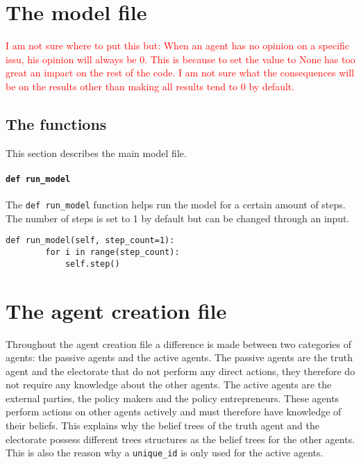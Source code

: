 

%
\section{The model file}

\textcolor{red}{I am not sure where to put this but: When an agent has no opinion on a specific issu, his opinion will always be 0. This is because to set the value to None has too great an impact on the rest of the code. I am not sure what the consequences will be on the results other than making all results tend to 0 by default.}

\subsection{The functions}

This section describes the main model file.

\paragraph{\texttt{def run\_model}}

The \texttt{def run\_model} function helps run the model for a certain amount of steps. The number of steps is set to 1 by default but can be changed through an input.

\begin{lstlisting}
def run_model(self, step_count=1):
		for i in range(step_count):
			self.step()
\end{lstlisting}


%
\section{The agent creation file}

Throughout the agent creation file a difference is made between two categories of agents: the passive agents and the active agents. The passive agents are the truth agent and the electorate that do not perform any direct actions, they therefore do not require any knowledge about the other agents. The active agents are the external parties, the policy makers and the policy entrepreneurs. These agents perform actions on other agents actively and must therefore have knowledge of their beliefs. This explains why the belief trees of the truth agent and the electorate possess different trees structures as the belief trees for the other agents. This is also the reason why a \texttt{unique\_id} is only used for the active agents.

